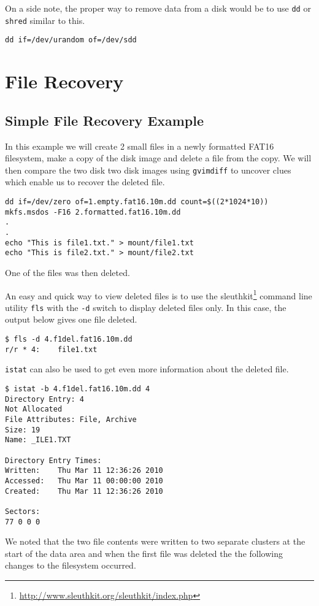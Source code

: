 \documentclass[a4paper,
    11pt,
    normalheadings,
    parindent,
    UKenglish,
    abstracton,
    ]{scrartcl}
\begin{document}
On a side note, the proper way to remove data from a disk would be to use \texttt{dd} or \texttt{shred} similar to this.

\begin{verbatim}
dd if=/dev/urandom of=/dev/sdd
\end{verbatim}

\section{File Recovery}
\subsection{Simple File Recovery Example}
In this example we will create 2 small files in a newly formatted FAT16 filesystem, make a copy of the disk image and delete a file from the copy. We will then compare the two disk two disk images using \texttt{gvimdiff} to uncover clues which enable us to recover the deleted file.

\begin{verbatim}
dd if=/dev/zero of=1.empty.fat16.10m.dd count=$((2*1024*10))
mkfs.msdos -F16 2.formatted.fat16.10m.dd 
.
.
echo "This is file1.txt." > mount/file1.txt
echo "This is file2.txt." > mount/file2.txt
\end{verbatim}
One of the files was then deleted.

An easy and quick way to view deleted files is to use the sleuthkit\footnote{\url{http://www.sleuthkit.org/sleuthkit/index.php}} command line utility \texttt{fls} with the \texttt{-d} switch to display deleted files only. In this case, the output below gives one file deleted.
\begin{verbatim}
$ fls -d 4.f1del.fat16.10m.dd 
r/r * 4:	file1.txt
\end{verbatim}

\texttt{istat} can also be used to get even more information about the deleted file.
\begin{verbatim}
$ istat -b 4.f1del.fat16.10m.dd 4
Directory Entry: 4
Not Allocated
File Attributes: File, Archive
Size: 19
Name: _ILE1.TXT

Directory Entry Times:
Written:	Thu Mar 11 12:36:26 2010
Accessed:	Thu Mar 11 00:00:00 2010
Created:	Thu Mar 11 12:36:26 2010

Sectors:
77 0 0 0 
\end{verbatim}

We noted that the two file contents were written to two separate clusters at the start of the data area and when the first file was deleted the the following changes to the filesystem occurred.
\end{document}
